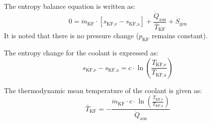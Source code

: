 The entropy balance equation is written as:  
\[
0 = \dot{m}_{\text{KF}} \cdot \left[ s_{\text{KF,e}} - s_{\text{KF,a}} \right] + \frac{\dot{Q}_{\text{aus}}}{\bar{T}_{\text{KF}}} + \dot{S}_{\text{gen}}
\]  
It is noted that there is no pressure change (\( p_{\text{KF}} \) remains constant).  

The entropy change for the coolant is expressed as:  
\[
s_{\text{KF,e}} - s_{\text{KF,a}} = c \cdot \ln\left(\frac{T_{\text{KF,e}}}{T_{\text{KF,a}}}\right)
\]  

The thermodynamic mean temperature of the coolant is given as:  
\[
\bar{T}_{\text{KF}} = -\frac{\dot{m}_{\text{KF}} \cdot c \cdot \ln\left(\frac{T_{\text{KF,e}}}{T_{\text{KF,a}}}\right)}{\dot{Q}_{\text{aus}}}
\]